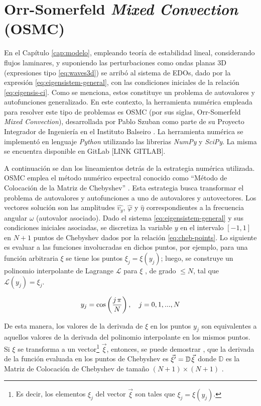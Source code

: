 \section{Orr-Somerfeld \textit{Mixed Convection} (OSMC)}

En el Capítulo \ref{cap:modelo}, empleando teoría de estabilidad lineal, considerando flujos laminares, y suponiendo las perturbaciones como ondas planas 3D (expresiones tipo \ref{eq:waves3d}) se arribó al sistema de EDOs, dado por la expresión \ref{eq:eigensistem-general}, con las condiciones iniciales de la relación \ref{eq:eigensis-ci}. Como se menciona, estos constituye un problema de autovalores y autofunciones generalizado. En este contexto, la herramienta numérica empleada para resolver este tipo de problemas es OSMC (por sus siglas, Orr-Somerfeld \textit{Mixed Convection}), desarrollada por Pablo Szuban como parte de su Proyecto Integrador de Ingeniería en el Instituto Balseiro \cite{szuban2023}. La herramienta numérica se implementó en lenguaje \textit{Python} utilizando las librerias \textit{NumPy} y \textit{SciPy}. La misma se encuentra disponible en GitLab [LINK GITLAB].

A continuación se dan los lineamientos detrás de la estrategia numérica utilizada. OSMC emplea el método numérico espectral conocido como ``Método de Colocación de la Matriz de Chebyshev'' \cite{moin2010fundamentals}. Esta estrategia busca transformar el problema de autovalores y autofunciones a uno de autovalores y autovectores. Los vectores solución son las amplitudes $\widehat{v_y}$, $\widehat{\varphi}$ y $\widehat{\eta}$ correspondientes a la frecuencia angular $\omega$ (autovalor asociado). Dado el sistema \ref{eq:eigensistem-general} y sus condiciones iniciales asociadas, se discretiza la variable $y$ en el intervalo $\left[-1,1\right]$ en $N+1$ puntos de Chebyshev dados por la relación \ref{eq:cheb-points}. Lo siguiente es evaluar a las funciones involucradas en dichos puntos, por ejemplo, para una función arbitraria $\xi$ se tiene los puntos $\xi_j = \xi(y_j)$; luego, se construye un polinomio interpolante de Lagrange $\mathcal{L}$ para $\xi$ , de grado $\leq N$, tal que $\mathcal{L}(y_j) = \xi_j$.

\begin{equation}
y_j = \cos \left( \frac{j \hspace{0.5mm} \pi}{N} \right), \quad j=0,1,...,N 
\label{eq:cheb-points}
\end{equation}

De esta manera, los valores de la derivada de $\xi$ en los puntos $y_j$ son equivalentes a aquellos valores de la derivada del polinomio interpolante en los mismos puntos. Si $\xi$ se transforma a un vector\footnote{Es decir, los elementos $\xi_j$ del vector $\vec{\xi}$ son tales que $\xi_j = \xi(y_j)$.} $\vec{\xi}$, entonces, se puede demostrar \cite{moin2010fundamentals}, que la derivada de la función evaluada en los puntos de Chebyshev es $\vec{\xi^{\prime}} = \mathbb{D} \hspace{0.4mm} \vec{\xi}$ donde $\mathbb{D}$ es la Matriz de Colocación de Chebyshev de tamaño $(N+1) \times (N+1)$ \cite{trefethen}.

